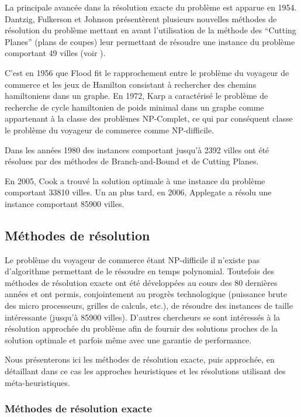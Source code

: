  La principale avancée dans la résolution exacte du problème est apparue en 1954. Dantzig, Fulkerson et Johnson présentèrent plusieurs nouvelles méthodes de résolution du problème mettant en avant l'utilisation de la méthode des ``Cutting Planes'' (plans de coupes) leur permettant de résoudre une instance du problème comportant 49 villes (voir \cite{Dantzig1954}).
 
 C'est en 1956 que Flood fit le rapprochement entre le problème du voyageur de commerce et les jeux de Hamilton consistant à rechercher des chemins hamiltoniens dans un graphe. En 1972, Karp a caractérisé le problème de recherche de cycle hamiltonien de poids minimal dans un graphe comme appartenant à la classe des problèmes NP-Complet, ce qui par conséquent classe le problème du voyageur de commerce comme NP-difficile.
 
 Dans les années 1980 des instances comportant jusqu'à 2392 villes ont été résolues par des méthodes de Branch-and-Bound et de Cutting Planes.
 
 En 2005, Cook a trouvé la solution optimale à une instance du problème comportant 33810 villes. Un an plus tard, en 2006, Applegate a résolu une instance comportant 85900 villes.

\subsection{Méthodes de résolution}

Le problème du voyageur de commerce étant NP-difficile il n'existe pas d'algorithme permettant de le résoudre en temps polynomial. Toutefois des méthodes de résolution exacte ont été développées au cours des 80 dernières années et ont permis, conjointement au progrès technologique (puissance brute des micro processeurs, grilles de calculs, etc.), de résoudre des instances de taille intéressante (jusqu'à 85900 villes). D'autres chercheurs se sont intéressés à la résolution approchée du problème afin de fournir des solutions proches de la solution optimale et parfois même avec une garantie de performance.

Nous présenterons ici les méthodes de résolution exacte, puis approchée, en détaillant dans ce cas les approches heuristiques et les résolutions utilisant des méta-heuristiques.

\subsubsection{Méthodes de résolution exacte}\label{resolutionExacteTSP}

